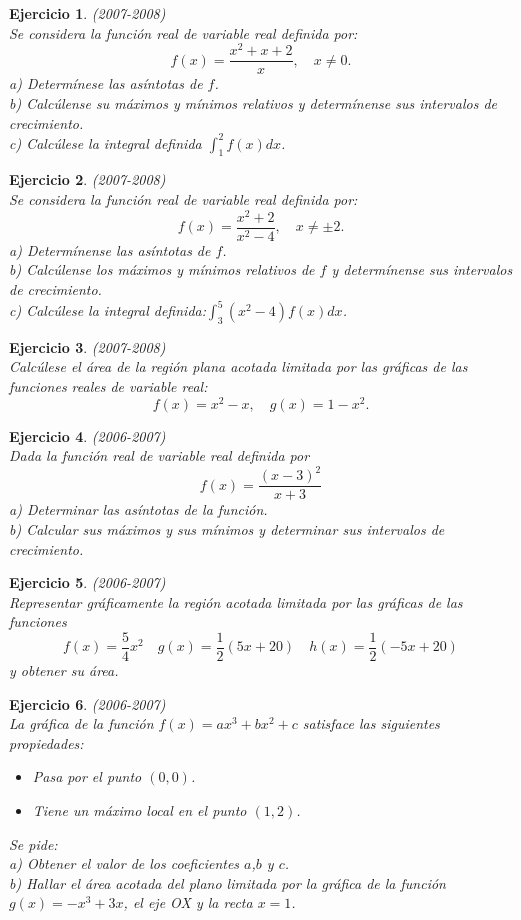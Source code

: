 \documentclass[12pt, a4paper]{amsart}
\newtheorem{ejer}{Ejercicio}
\begin{document}
\begin{ejer}\em (2007-2008)\\%
Se considera la función real de variable real definida por:
$$
f(x)=\frac{x^2+x+2}{x}, \quad x\neq 0.
$$
a) Determínese las asíntotas de $f$.\\
b) Calcúlense su máximos y mínimos relativos y determínense sus intervalos de crecimiento.\\
c) Calcúlese la integral definida $\int_1^2 f(x)dx$.
\end{ejer}

\begin{ejer}\em (2007-2008)\\%
Se considera la función real de variable real definida por:
$$
f(x)=\frac{x^2+2}{x^2-4}, \quad x\neq \pm 2.
$$
a) Determínense las asíntotas de $f$.\\
b) Calcúlense los máximos y mínimos relativos de $f$ y determínense sus intervalos de crecimiento.\\
c) Calcúlese la integral definida:$\int_3^5(x^2-4)f(x)dx$.
\end{ejer}


\begin{ejer}\em (2007-2008)\\
Calcúlese el área de la región plana acotada limitada por las gráficas de las funciones reales de variable real:
$$
f(x)=x^2-x, \quad g(x)=1-x^2.
$$
\end{ejer}

\begin{ejer}\em (2006-2007)\\
Dada la función real de variable real definida por
$$
f(x)=\frac{(x-3)^2}{x+3}
$$
a) Determinar las asíntotas de la función.\\
b) Calcular sus máximos y sus mínimos y determinar sus intervalos de crecimiento.
\end{ejer}

\begin{ejer}\em (2006-2007)\\
Representar gráficamente la región acotada limitada por las gráficas de las funciones
$$
f(x)=\frac{5}{4}x^2 \quad g(x)=\frac{1}{2}(5x+20) \quad h(x)=\frac{1}{2}(-5x+20)
$$
y obtener su área.
\end{ejer}

\begin{ejer}\em (2006-2007)\\
La gráfica de la función $f(x)=ax^3+bx^2+c$ satisface las siguientes propiedades:
\begin{itemize}
\item[$\circ$] Pasa por el punto $(0,0)$.
\item[$\circ$] Tiene un máximo local en el punto $(1,2)$.
\end{itemize}
Se pide:\\
a) Obtener el valor de los coeficientes $a$,$b$ y $c$.\\
b) Hallar el área acotada del plano limitada por la gráfica de la función $g(x)=-x^3+3x$, el eje OX y la recta $x=1$.
\end{ejer}
\end{document}

